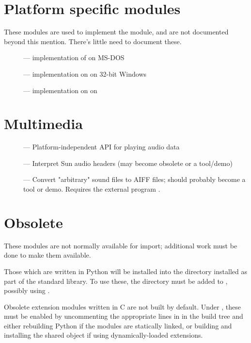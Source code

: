 \section{Platform specific modules}

These modules are used to implement the  module,
and are not documented beyond this mention.  There's little need to
document these.

\begin{description}
\item[]
--- implementation of  on MS-DOS

\item[]
--- implementation on  on 32-bit Windows

\item[]
--- implementation on  on \POSIX{}
\end{description}


\section{Multimedia}

\begin{description}
\item[]
--- Platform-independent API for playing audio data

\item[]
--- Interpret Sun audio headers (may become obsolete or a tool/demo)

\item[]
--- Convert "arbitrary" sound files to AIFF files; should probably
become a tool or demo.  Requires the external program .
\end{description}


\section{Obsolete \label{obsolete-modules}}

These modules are not normally available for import; additional work
must be done to make them available.

Those which are written in Python will be installed into the directory 
 installed as part of the standard library.  To use
these, the directory must be added to , possibly using
.

Obsolete extension modules written in C are not built by default.
Under \UNIX, these must be enabled by uncommenting the appropriate
lines in  in the build tree and either rebuilding
Python if the modules are statically linked, or building and
installing the shared object if using dynamically-loaded extensions.


